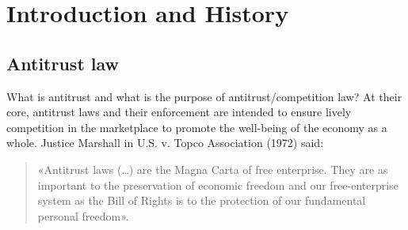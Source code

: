 \chapter{Introduction and History}
\vspace{-1.5cm}

{\chaptoc\noindent\begin{minipage}[inner sep=0,outer sep=0]{0.9\linewidth}\section{Antitrust law}\end{minipage}}

    What is antitrust and what is the purpose of antitrust/competition law? 
    At their core, antitrust laws and their enforcement are intended to ensure lively competition in the marketplace to promote the well-being of the economy as a whole.
    Justice Marshall in U.S. v. Topco Association (1972) said:
    \begin{quote}
        «Antitrust laws (…) are the Magna Carta of free enterprise. They are as important to the preservation of economic freedom and our free-enterprise system as the Bill of Rights is to the protection of our fundamental personal freedom». 
    \end{quote}

    

